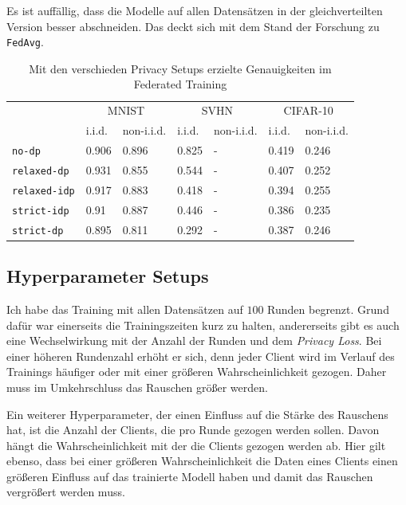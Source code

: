Es ist auffällig, dass die Modelle auf allen Datensätzen in der gleichverteilten Version besser abschneiden. Das deckt sich mit dem Stand der Forschung zu \texttt{FedAvg}.

\begin{table}
	\centering
	\caption{Mit den verschieden Privacy Setups erzielte Genauigkeiten im Federated Training}
	\begin{tabular}{lp{4em}p{4em}p{4em}p{4em}p{4em}p{4em}}
		\toprule 
	 	& \multicolumn{2}{c}{MNIST} & \multicolumn{2}{c}{SVHN} & \multicolumn{2}{c}{CIFAR-10} \\
		\cmidrule(lr){2-3}\cmidrule(lr){4-5}\cmidrule(lr){6-7}
		& i.i.d. & non-i.i.d. & i.i.d. & non-i.i.d. & i.i.d. & non-i.i.d. \\
		\midrule
		\texttt{no-dp} & 0.906 & 0.896 & 0.825 & - & 0.419 & 0.246 \\
		\texttt{relaxed-dp} & 0.931 & 0.855 & 0.544 & - & 0.407 & 0.252 \\
		\texttt{relaxed-idp} & 0.917 & 0.883 & 0.418 & - & 0.394 & 0.255 \\
		\texttt{strict-idp} & 0.91 & 0.887 & 0.446 & - & 0.386 & 0.235 \\
		\texttt{strict-dp} & 0.895 & 0.811 & 0.292 & - & 0.387 & 0.246 \\
		\bottomrule
	\end{tabular}
	\label{tab:all-fed-results}
\end{table}

\subsection{Hyperparameter Setups}
Ich habe das Training mit allen Datensätzen auf $100$ Runden begrenzt. Grund dafür war einerseits die Trainingszeiten kurz zu halten, andererseits gibt es auch eine Wechselwirkung mit der Anzahl der Runden und dem \textit{Privacy Loss}. Bei einer höheren Rundenzahl erhöht er sich, denn jeder Client wird im Verlauf des Trainings häufiger oder mit einer größeren Wahrscheinlichkeit gezogen. Daher muss im Umkehrschluss das Rauschen größer werden. 

Ein weiterer Hyperparameter, der einen Einfluss auf die Stärke des Rauschens hat, ist die Anzahl der Clients, die pro Runde gezogen werden sollen. Davon hängt die Wahrscheinlichkeit mit der die Clients gezogen werden ab. Hier gilt ebenso, dass bei einer größeren Wahrscheinlichkeit die Daten eines Clients einen größeren Einfluss auf das trainierte Modell haben und damit das Rauschen vergrößert werden muss.

